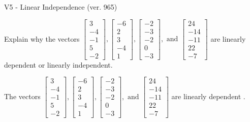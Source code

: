 \begin{exercise}
  \begin{exerciseTitle}V5 - Linear Independence (ver. 965)\end{exerciseTitle}
  \begin{exerciseStatement}
    Explain why the vectors \(\left[\begin{array}{r}
3 \\
-4 \\
-1 \\
5 \\
-2
\end{array}\right] , \left[\begin{array}{r}
-6 \\
2 \\
3 \\
-4 \\
1
\end{array}\right] , \left[\begin{array}{r}
-2 \\
-3 \\
-2 \\
0 \\
-3
\end{array}\right] , \text{ and } \left[\begin{array}{r}
24 \\
-14 \\
-11 \\
22 \\
-7
\end{array}\right]\) are linearly dependent or linearly independent.	


  \end{exerciseStatement}
  \begin{exerciseAnswer}
   The vectors \(\left[\begin{array}{r}
3 \\
-4 \\
-1 \\
5 \\
-2
\end{array}\right] , \left[\begin{array}{r}
-6 \\
2 \\
3 \\
-4 \\
1
\end{array}\right] , \left[\begin{array}{r}
-2 \\
-3 \\
-2 \\
0 \\
-3
\end{array}\right] , \text{ and } \left[\begin{array}{r}
24 \\
-14 \\
-11 \\
22 \\
-7
\end{array}\right]\) are 
  	 linearly dependent  .
  


  \end{exerciseAnswer}
\end{exercise}
